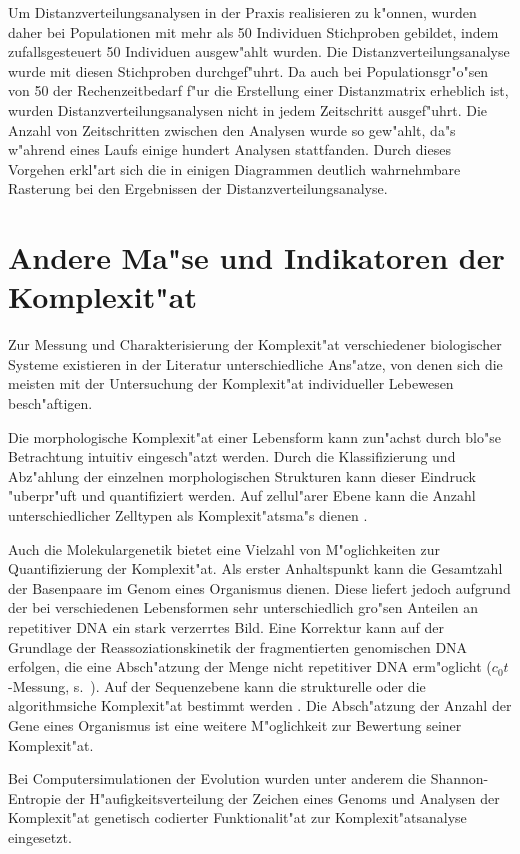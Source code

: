 Um Distanzverteilungsanalysen in der Praxis realisieren zu k"onnen, wurden daher bei Populationen mit mehr als 50
Individuen Stichproben gebildet, indem zufallsgesteuert 50 Individuen ausgew"ahlt wurden. Die Distanzverteilungsanalyse
wurde mit diesen Stichproben durchgef"uhrt. Da auch bei Populationsgr"o"sen von 50 der Rechenzeitbedarf f"ur
die Erstellung einer Distanzmatrix erheblich ist, wurden Distanzverteilungsanalysen nicht in jedem Zeitschritt
ausgef"uhrt. Die Anzahl von Zeitschritten zwischen den Analysen wurde so gew"ahlt, da"s w"ahrend eines Laufs
einige hundert Analysen stattfanden. Durch dieses Vorgehen erkl"art sich die in einigen Diagrammen deutlich wahrnehmbare
Rasterung bei den Ergebnissen der Distanzverteilungsanalyse.


\section{Andere Ma"se und Indikatoren der Komplexit"at}

Zur Messung und Charakterisierung der Komplexit"at verschiedener biologischer Systeme existieren in der Literatur
unterschiedliche Ans"atze, von denen sich die meisten mit der Untersuchung der Komplexit"at individueller Lebewesen
besch"aftigen.

Die morphologische Komplexit"at einer Lebensform kann zun"achst durch blo"se Betrachtung 
intuitiv eingesch"atzt werden.
Durch die Klassifizierung und Abz"ahlung der einzelnen morphologischen Strukturen
kann dieser Eindruck "uberpr"uft und quantifiziert werden. Auf zellul"arer Ebene kann die Anzahl unterschiedlicher
Zelltypen als Komplexit"atsma"s dienen \cite{Bonner88}.

Auch die Molekulargenetik bietet eine Vielzahl von M"oglichkeiten zur Quantifizierung der Komplexit"at. Als erster
Anhaltspunkt kann die Gesamtzahl der Basenpaare im Genom eines Organismus dienen. Diese liefert jedoch aufgrund der
bei verschiedenen Lebensformen sehr unterschiedlich gro"sen Anteilen an repetitiver DNA ein stark verzerrtes Bild.
Eine Korrektur kann auf der Grundlage der Reassoziationskinetik der fragmentierten genomischen DNA erfolgen, die eine
Absch"atzung der Menge nicht repetitiver DNA erm"oglicht ($c_0t$-Messung, s.\ \cite{Kornberg80}). Auf der Sequenzebene
kann die strukturelle oder die algorithmsiche Komplexit"at bestimmt werden \cite{Speicher89}. Die Absch"atzung der
Anzahl der Gene eines Organismus ist eine weitere M"oglichkeit zur Bewertung seiner Komplexit"at.

Bei Computersimulationen der Evolution wurden unter anderem die Shannon-Entropie der H"aufigkeitsverteilung der Zeichen
eines Genoms \cite{Thearling94} und Analysen der Komplexit"at genetisch codierter Funktionalit"at zur Komplexit"atsanalyse
\cite{Horn92} eingesetzt.

